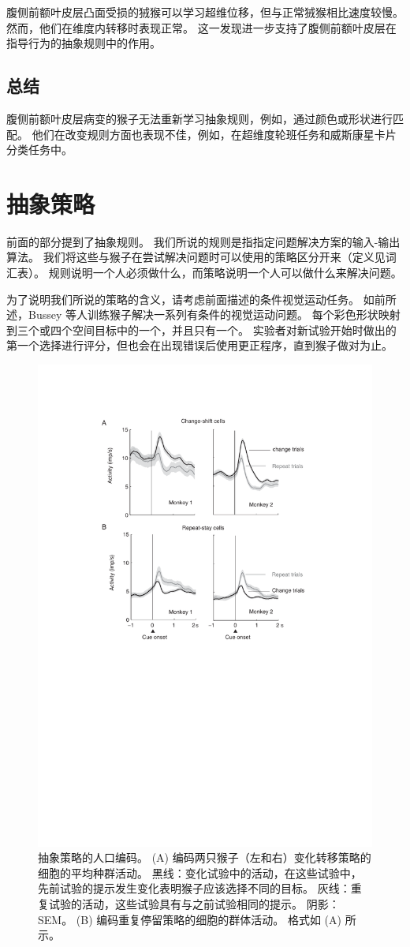 腹侧前额叶皮层凸面受损的狨猴可以学习超维位移，但与正常狨猴相比速度较慢\cite{dias1997dissociable}。
然而，他们在维度内转移时表现正常。 
这一发现进一步支持了腹侧前额叶皮层在指导行为的抽象规则中的作用。



\subsection{总结}
\par

腹侧前额叶皮层病变的猴子无法重新学习抽象规则，例如，通过颜色或形状进行匹配。
他们在改变规则方面也表现不佳，例如，在超维度轮班任务和威斯康星卡片分类任务中。



\section{抽象策略}
\par 
前面的部分提到了抽象规则。
我们所说的规则是指指定问题解决方案的输入-输出算法。
我们将这些与猴子在尝试解决问题时可以使用的策略区分开来（定义见词汇表）。
规则说明一个人必须做什么，而策略说明一个人可以做什么来解决问题。
\par 


为了说明我们所说的策略的含义，请考虑前面描述的条件视觉运动任务。 
如前所述，Bussey 等人\cite{bussey2001role}训练猴子解决一系列有条件的视觉运动问题。
每个彩色形状映射到三个或四个空间目标中的一个，并且只有一个。
实验者对新试验开始时做出的第一个选择进行评分，但也会在出现错误后使用更正程序，直到猴子做对为止。


 \begin{figure}
	\centering
	\includegraphics[width=0.6\linewidth]{chap7/7_11}
	\caption{抽象策略的人口编码。
		 (A) 编码两只猴子（左和右）变化转移策略的细胞的平均种群活动。
		 黑线：变化试验中的活动，在这些试验中，先前试验的提示发生变化表明猴子应该选择不同的目标。
		 灰线：重复试验的活动，这些试验具有与之前试验相同的提示。
		 阴影：SEM。
		 (B) 编码重复停留策略的细胞的群体活动。
		 格式如 (A) 所示\cite{genovesio2007neurophysiology}。\label{fig:7_11}}
\end{figure}
\par


